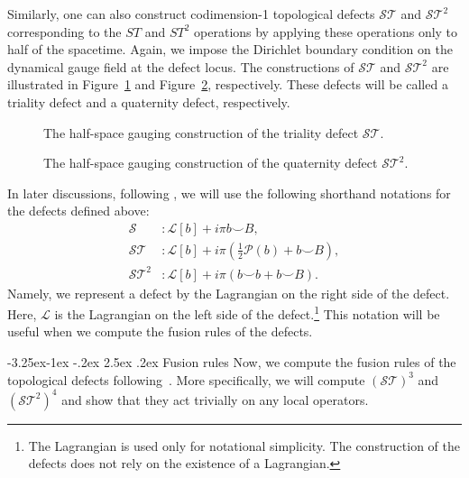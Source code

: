 \documentclass[aps,twocolumn,prx,floatfix,preprintnumbers, nofootinbib,10pt]{revtex4-2}
\makeatletter
\numberwithin{equation}{section}
\theoremstyle{definition}
\theoremstyle{remark}
\theoremstyle{claim}
\renewcommand\subsubsection{\@startsection{subsubsection}{3}{\z@}%
                                     {-3.25ex\@plus -1ex \@minus -.2ex}%
                                     {2.5ex \@plus .2ex}%
                                     {\centering\itshape\bfseries\small}}
\makeatother
\begin{document}
Similarly, one can also construct codimension-1 topological defects $\mathcal{ST}$ and $\mathcal{S}\mathcal{T}^2$ corresponding to the $ST$ and $ST^2$ operations by applying these operations only to half of the spacetime.
Again, we impose the Dirichlet boundary condition on the dynamical gauge field at the defect locus.
The constructions of $\mathcal{ST}$ and $\mathcal{S}\mathcal{T}^2$ are illustrated in Figure~\ref{fig: DT defect} and Figure~\ref{fig: DU defect}, respectively.
These defects will be called a triality defect and a quaternity defect, respectively.
\begin{figure}
\centering
{}
\caption{The half-space gauging construction of the triality defect $\mathcal{ST}$.}
\label{fig: DT defect}
\end{figure}
\begin{figure}
\centering
{}
\caption{The half-space gauging construction of the quaternity defect $\mathcal{S}\mathcal{T}^2$.}
\label{fig: DU defect}
\end{figure}

In later discussions, following \cite{Choi:2022zal}, we will use the following shorthand notations for the defects defined above:
\begin{align}
\mathcal{S}&: \mathcal{L}[b] + i \pi b \smile B, \\
\mathcal{S}\mathcal{T}&: \mathcal{L}[b] + i\pi \left(\frac{1}{2}\mathcal{P}(b) + b \smile B\right), \label{eq: DT lag} \\
\mathcal{S}\mathcal{T}^2&: \mathcal{L}[b] + i \pi (b \smile b + b \smile B) \label{eq: DU lag}.
\end{align}
Namely, we represent a defect by the Lagrangian on the right side of the defect.
Here, $\mathcal{L}$ is the Lagrangian on the left side of the defect.\footnote{The Lagrangian is used only for notational simplicity. The construction of the defects does not rely on the existence of a Lagrangian.}
This notation will be useful when we compute the fusion rules of the defects.

\subsubsection{Fusion rules}
\label{sec: Z2 fusion computation}
Now, we compute the fusion rules of the topological defects following~\cite{Choi:2022zal}.
More specifically, we will compute $(\mathcal{ST})^3$ and $(\mathcal{S}\mathcal{T}^2)^4$ and show that they act trivially on any local operators.
\end{document}
